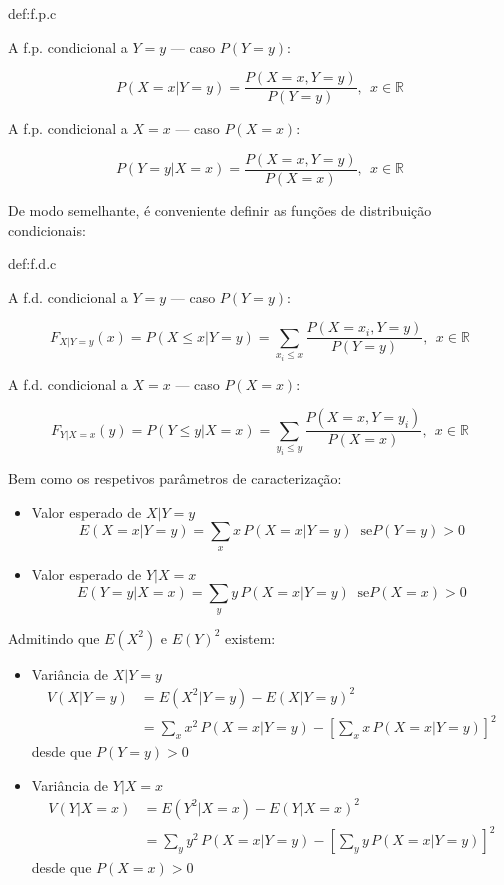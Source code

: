 \begin{theo}{def:f.p.c}\label{def:f.p.c}

    \noindent A f.p. condicional a $Y = y$ --- caso $P(Y = y)$:

    $$
        P(X = x | Y = y) = \dfrac{P(X = x, Y = y)}{P(Y = y)},\;\, x \in \mathbb{R}
    $$

    \noindent A f.p. condicional a $X = x$ --- caso $P(X = x)$:

    $$
        P(Y = y | X = x) = \dfrac{P(X = x, Y = y)}{P(X = x)},\;\, x \in \mathbb{R}
    $$
\end{theo}

\noindent De modo semelhante, é conveniente definir as funções de distribuição condicionais:

\begin{theo}{def:f.d.c}\label{def:f.d.c}

    \noindent A f.d. condicional a $Y = y$ --- caso $P(Y = y)$:

    $$
        F_{X|Y=y}(x) = P(X \leq x | Y = y) = \sum_{x_i \leq x}\dfrac{P(X = x_i, Y = y)}{P(Y = y)},\;\, x \in \mathbb{R}
    $$

    \noindent A f.d. condicional a $X = x$ --- caso $P(X = x)$:

    $$
        F_{Y|X=x}(y) = P(Y \leq y | X = x) = \sum_{y_i \leq y}\dfrac{P(X = x, Y = y_i)}{P(X = x)},\;\, x \in \mathbb{R}
    $$
\end{theo}

\noindent Bem como os respetivos parâmetros de caracterização:

\begin{itemize}
    \item Valor esperado de $X | Y = y$
    $$
        E(X = x | Y = y) = \sum_x x\, P(X = x | Y = y)\;\; \text{se}P(Y = y) > 0
    $$
    \item Valor esperado de $Y | X = x$
    $$
        E(Y = y | X = x) = \sum_y y\, P(X = x | Y = y)\;\; \text{se}P(X = x) > 0
    $$
\end{itemize}

Admitindo que $E(X^2)$ e $E(Y)^2$ existem:
\begin{itemize}
    \item Variância de $X | Y = y$
    \begin{align*}
        V(X | Y = y) &= E(X^2 | Y = y) - E(X | Y = y)^2\\
        &= \sum_x x^2\, P(X = x | Y = y) - \left[\sum_x x\, P(X = x | Y = y)\right]^2
    \end{align*}
    desde que $P(Y = y) > 0$

    \item Variância de $Y | X = x$
    \begin{align*}
        V(Y | X = x) &= E(Y^2 | X = x) - E(Y | X = x)^2\\
        &= \sum_y y^2\, P(X = x | Y = y) - \left[\sum_y y\, P(X = x | Y = y)\right]^2
    \end{align*}
    desde que $P(X = x) > 0$  
\end{itemize}

